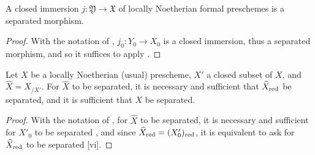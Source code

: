 \begin{proposition}[10.15.6]
\label{I.10.15.6}
A closed immersion $j:\mathfrak{Y}\to\mathfrak{X}$ of locally Noetherian formal preschemes is a separated morphism.
\end{proposition}

\begin{proof}
With the notation of , $j_0:Y_0\to X_0$ is a closed immersion, thus a separated morphism, and so it suffices to apply .
\end{proof}

\begin{proposition}[10.15.7]
\label{I.10.15.7}
Let $X$ be a locally Noetherian (usual) prescheme, $X'$ a closed subset of $X$, and $\widehat{X}=X_{/X'}$.
For $\widehat{X}$ to be separated, it is necessary and sufficient that $\widehat{X}_{\mathrm{red}}$ be separated, and it is sufficient that $X$ be separated.
\end{proposition}

\begin{proof}
With the notation of , for $\widehat{X}$ to be separated, it is necessary and sufficient for $X'_0$ to be separated , and since $\widehat{X}_{\mathrm{red}}=(X'_0)_{\mathrm{red}}$, it is equivalent to ask for $\widehat{X}_{\mathrm{red}}$ to be separated [vi].
\end{proof}
